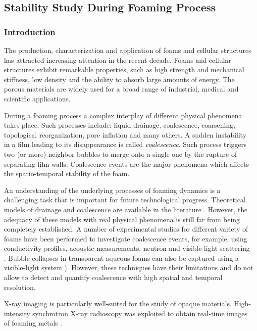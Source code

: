 \subsection{Stability Study During Foaming Process}
\label{application_foams}

\subsubsection{Introduction}

The production, characterization and application of foams and cellular structures has attracted increasing attention in the recent decade. Foams and cellular structures exhibit remarkable properties, such as high strength and mechanical stiffness, low density and the ability to absorb large amounts of energy. The porous materials are widely used for a broad range of industrial, medical and scientific applications.

During a foaming process a complex interplay of different physical phenomena takes place. Such processes include: liquid drainage,
coalescence, coarsening, topological reorganization, pore
inflation and many others. A sudden instability in a film leading to its disappearance is called \textit{coalescence}. Such process triggers two (or more) neighbor bubbles to merge onto a single one by the rupture of separating film walls. Coalescence events are the major phenomena which affects the spatio-temporal stability of the foam. 

An understanding of the underlying processes of foaming dynamics is a challenging task that is important for future technological progress.
Theoretical models of drainage and
coalescence are available in the literature \cite{Bhakta97, Ireland09}.  However, the adequacy of these models with real physical phenomena is still far from being completely established.
A number of experimental studies for different variety of foams have been performed to investigate coalescence events, for example, using
conductivity profiles, acoustic measurements, neutron and visible-light scattering \cite{Myagotin12}. Bubble collapses in transparent aqueous
foams can also be captured  using a visible-light system \cite{Rouyer03}). However, these techniques have their limitations and do not allow to detect and quantify coalescence with high spatial and temporal resolution.

X-ray imaging is particularly well-suited for the study of opaque
materials. High-intensity synchrotron X-ray radioscopy was exploited to obtain real-time images of foaming metals \cite{Banhart01}.

